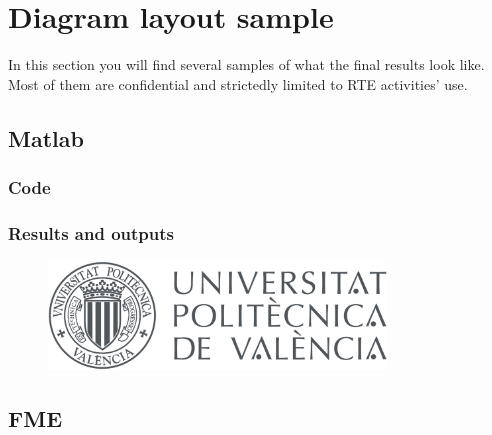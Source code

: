 \chapter[Diagram layout samples and evolution]{Diagram layout sample}
\label{sec:Appendix:Diagram}
\begin{Resumen}

In this section you will find several samples of what the final results look like. Most of them are confidential and strictedly limited to RTE activities' use.
\end{Resumen}

\PartialToc

\section{Matlab}
\label{subsec:Appendix:Diagram:Matlab}

\subsection{Code}
\label{subsec:Appendix:Diagram:Matlab:code}

\subsection{Results and outputs}
\label{subsec:Appendix:Diagram:Matlab:results}

\begin{figure}[ht]
    \bigskip
    \begin{center}
        \parbox[t]{0.8\textwidth}{
        \href{}
            {\includegraphics[width=0.8\textwidth]{0.logos/UPV_horitzontal_color.jpg}}
        }
        \label{fig:Matlab-prototype}
    \end{center}
\end{figure}

\section{FME}

